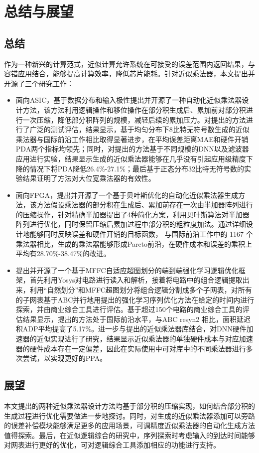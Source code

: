\chapter{总结与展望}

\section{总结}

作为一种新兴的计算范式，近似计算允许系统在可接受的误差范围内返回结果，与容错应用结合，能够提高计算效率，降低芯片能耗。针对近似乘法器，本文提出并开源了三个研究工作：
\begin{itemize}
    \item 面向ASIC，基于数据分布和输入极性提出并开源了一种自动化近似乘法器设计方法，该方法利用逻辑操作和移位操作在部分积生成后、累加前对部分积进行一次压缩，降低部分积阵列的规模，减轻后续的累加压力。对提出的方法进行了广泛的测试评估，结果显示，基于均匀分布下8比特无符号数生成的近似乘法器与国际前沿工作相比取得显著进步，在平均误差距离MAE和硬件开销PDA两个指标均领先；同时，对提出的方法基于不同规模的DNN以及滤波器应用进行实验，结果显示生成的近似乘法器能够在几乎没有引起应用级精度下降的情况下将PDA降低26.4\%-27.1\%；最后基于正态分布32比特无符号数的实验结果证明了方法对大位宽乘法器的有效性。
    \item 面向FPGA，提出并开源了一个基于贝叶斯优化的自动化近似乘法器生成方法，该方法假设乘法器的部分积在生成后、累加前存在一次由半加器阵列进行的压缩操作，针对精确半加器提出了4种简化方案，利用贝叶斯算法对半加器阵列进行优化，同时保留压缩后累加过程中部分积的粗粒度加法。通过详细设计地能够同时反映误差和硬件开销的目标函数， 与国际前沿工作中的 1167 个乘法器相比，生成的乘法器能够形成Pareto前沿，在硬件成本和误差的乘积上平均有28.70\%-38.47\%的改进。
    \item 提出并开源了一个基于MFFC自适应超图划分的端到端强化学习逻辑优化框架，首先利用Yosys对电路进行读入和解析，接着将电路中的组合逻辑提取出来，利用“自然划分”和MFFC超图划分将组合逻辑分割成多个子网表，对所有的子网表基于ABC并行地用提出的强化学习序列优化方法在给定的时间内进行探索，并由商业综合工具进行评估。基于超过150个电路的商业综合工具的评估结果显示，提出的方法处于国际前沿水平，与ABC resyn2 相比，面积延迟积ADP平均提高了5.17\%。进一步与提出的近似乘法器库结合，对DNN硬件加速器的近似实现进行了研究，结果显示近似乘法器的单独硬件成本与对应加速器的硬件成本存在一定偏差，因此在实际使用中可对库中的不同乘法器进行多次尝试，以实现更好的PPA。
\end{itemize}

\section{展望}

本文提出的两种近似乘法器设计方法均基于部分积的压缩实现，如何结合部分积的生成过程进行优化需要做进一步地探讨。同时，对生成的近似乘法器添加可以旁路的误差补偿模块能够满足更多的应用场景，可调精度近似乘法器的自动化生成方法值得探索。最后，在近似逻辑综合的研究中，序列探索时考虑输入的到达时间能够对网表进行更好的优化，可对逻辑综合工具添加相应的功能进行支持。